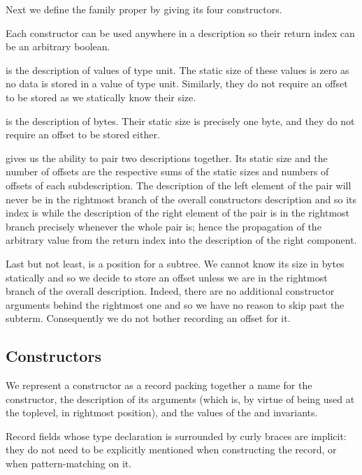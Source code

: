 Next we define the family proper by giving its four constructors.


Each constructor can be used anywhere in a description so their return
 index can be an arbitrary boolean.

 is the description of values of type unit. The static
size of these values is zero as no data is stored in a value of type unit.
Similarly, they do not require an offset to be stored as we statically
know their size.

 is the description of bytes.
%
Their static size is precisely one byte, and they do not require an
offset to be stored either.

 gives us the ability to pair two descriptions together.
Its static size and the number of offsets are the respective sums of the
static sizes and numbers of offsets of each subdescription.
%
The description of the left element of the pair will never be in the
rightmost branch of the overall constructors description and so its
index is  while the description of the right element
of the pair is in the rightmost branch precisely whenever the whole pair
is; hence the propagation of the  arbitrary value from the
return index into the description of the right component.

Last but not least,  is a position for a subtree.
We cannot know its size in bytes statically and so we decide to store
an offset unless we are in the rightmost branch of the overall description.
%
Indeed, there are no additional constructor arguments behind the rightmost
one and so we have no reason to skip past the subterm. Consequently we
do not bother recording an offset for it.


\subsection{Constructors}

We represent a constructor as a record packing together
a name for the constructor,
the description of its arguments (which is, by virtue of
being used at the toplevel, in rightmost position),
and the values of the  and
 invariants.


\begin{remark}
  Record fields whose type declaration is surrounded by
  curly braces are implicit: they do not need to be explicitly
  mentioned when constructing the record, or when pattern-matching
  on it.
\end{remark}

